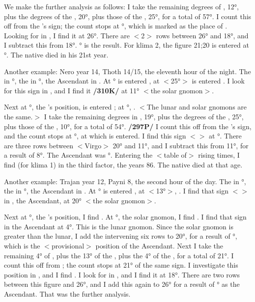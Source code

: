 We make the further analysis as follows: I take the remaining degrees of \Virgo, 12°, plus the degrees of the \Sun, 20°, plus those of the \Moon, 25°, for a total of 57°. I count this off from the \Moon’s sign; the count stops at \Cancer\xspace 27°, which is marked as the place of \Aquarius. Looking for \Aquarius\xspace in \Virgo, I find it at 26°. There are $<$2$>$ rows between 26° and 18°, and I subtract this from 18°. \Virgo\xspace 16° is the result. For klima 2, the figure 21;20 is entered at \Virgo\xspace 16°. The native died in his 21st year.

Another example: Nero year 14, Thoth 14/15, the eleventh hour of the night. The \Sun\xspace in °, the \Moon\xspace in \Aries\xspace 10°, the Ascendant in \Virgo. At \Virgo\xspace 25° is entered \Capricorn, at \Capricorn\xspace $<$25°$>$ is entered \Scorpio. I look for this sign in \Virgo, and I find it \textbf{/310K/} at 11° $<$the solar gnomon$>$. 

Next at \Aries\xspace 10°, the \Moon’s position, is entered \Virgo; at \Virgo\xspace 11°, \Scorpio. $<$The lunar and solar gnomons
are the same.$>$ I take the remaining degrees in \Virgo, 19°, plus the degrees of the \Sun, 25°, plus those of the \Moon, 10°, for a total of 54°. \textbf{/297P/} I count this off from the \Moon’s sign, and the count stops at \Taurus\xspace 24°, at which \Cancer\xspace is entered. I find this sign $<$\Cancer$>$ at °. There are three rows between $<$Virgo$>$ 20° and 11°, and I subtract this from 11°, for a result of 8°. The Ascendant was \Virgo\xspace
8°. Entering the $<$table of$>$ rising times, I find (for klima 1) in the third factor, the years 86. The native died at that age.

Another example: Trajan year 12, Payni 8, the second hour of the day. The \Sun\xspace in \Gemini\xspace 13°, the \Moon\xspace in \Capricorn\xspace 4°, the Ascendant in \Cancer. At \Gemini\xspace 13° is entered \Libra, at \Libra $<$13°$>$, \Virgo. I find that sign $<$\Virgo$>$ in \Cancer, the Ascendant, at 20° $<$the solar gnomon$>$. 

Next at \Capricorn\xspace 4°, the \Moon’s position, I find \Virgo. At \Virgo\xspace 20°, the solar gnomon, I find \Cancer. I find that sign in the Ascendant at 4°. This is the lunar gnomon. Since the solar gnomon is greater than the lunar, I add the intervening six rows to 20°, for a result of \Cancer\xspace 26°, which is the $<$provisional$>$ position of the Ascendant. Next I take the remaining 4° of \Cancer, plus the 13° of the \Sun, plus the 4° of the \Moon, for a total of 21°. I count this off from \Capricorn; the count stops at 21° of the same sign. I investigate this position in \Capricorn, and I find \Libra. I look for \Libra\xspace in \Cancer, and I find it at 18°. There are two rows between this figure and 26°, and I add this again to 26° for a result of \Cancer \xspace28° as the Ascendant. That was the further analysis. 


